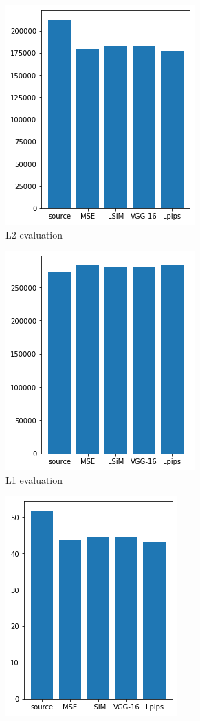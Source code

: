 \documentclass[a4paper,12pt,twoside]{report}
\begin{document}
\begin{figure}
	\centering
	\begin{subfigure}{0.32\textwidth}
		\centering
		\includegraphics[scale=0.49]{karman_low/numeval_l2.png}
		\caption{L2 evaluation}
	\end{subfigure}
	\begin{subfigure}{0.32\textwidth}
		\centering
		\includegraphics[scale=0.49]{karman_low/numeval_l1.png}
		\caption{L1 evaluation}
	\end{subfigure}
	\begin{subfigure}{0.32\textwidth}
		\centering
		\includegraphics[scale=0.49]{karman_low/numeval_mse.png}

\end{subfigure}
\end{figure}
\end{document}
